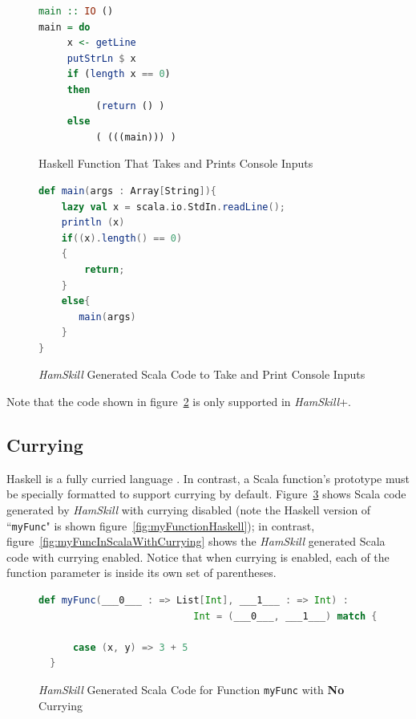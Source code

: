\documentclass{report}
\begin{document}
\begin{figure}[H]
\begin{mdframed}
\begin{lstlisting}[language=Haskell]
main :: IO ()
main = do 
     x <- getLine 
     putStrLn $ x
     if (length x == 0) 
     then 
          (return () )
     else
          ( (((main))) )
\end{lstlisting}
\end{mdframed}
\caption{Haskell Function That Takes and Prints Console Inputs}\label{fig:functionHaskellMainConsoleInput}
\end{figure}

\begin{figure}[H]
\begin{mdframed}
\begin{lstlisting}[language=scala]
def main(args : Array[String]){
    lazy val x = scala.io.StdIn.readLine();
    println (x)
    if((x).length() == 0)
    {
        return;
    }
    else{
       main(args)
    }
}
\end{lstlisting}
\end{mdframed}
\caption{\textit{HamSkill} Generated Scala Code to Take and Print Console Inputs}\label{fig:functionScalaMainConsoleInput}
\end{figure}

Note that the code shown in figure~\ref{fig:functionScalaMainConsoleInput} is only supported in \textit{HamSkill}+.

\subsection{Currying}\label{sec:currying}

Haskell is a fully curried language \cite{learnYouAHaskell}.  In contrast, a Scala function's prototype must be specially formatted to support currying by default. Figure~\ref{fig:myFuncInScalaNoCurrying} shows Scala code generated by \textit{HamSkill} with currying disabled (note the Haskell version of ``\texttt{myFunc}" is shown figure~\ref{fig:myFunctionHaskell}); in contrast, figure~\ref{fig:myFuncInScalaWithCurrying} shows the \textit{HamSkill} generated Scala code with currying enabled.  Notice that when currying is enabled, each of the function parameter is inside its own set of parentheses.

\begin{figure}[H]
\begin{mdframed}
\begin{lstlisting}[basicstyle=\small, language=scala]
  def myFunc(___0___ : => List[Int], ___1___ : => Int) : 
                           Int = (___0___, ___1___) match {
      
      case (x, y) => 3 + 5
  } 
\end{lstlisting}
\end{mdframed}
\caption{\textit{HamSkill} Generated Scala Code for Function \texttt{myFunc} with \textbf{No} Currying}\label{fig:myFuncInScalaNoCurrying}
\end{figure}
\end{document}
